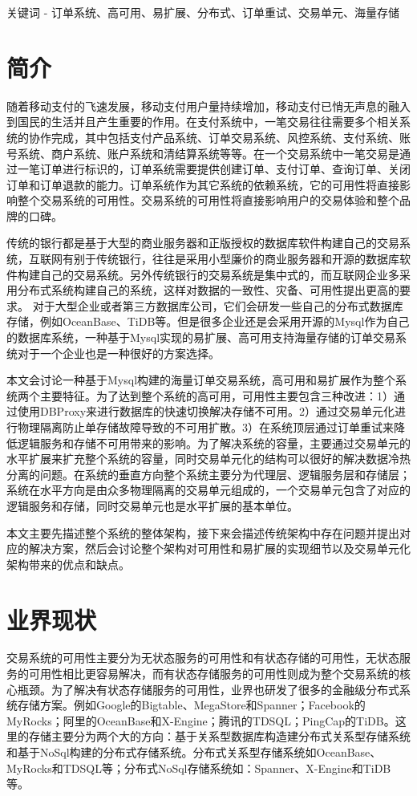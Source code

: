 \documentclass[letterpaper,twocolumn,10pt]{article}
\begin{document}
关键词 - 订单系统、高可用、易扩展、分布式、订单重试、交易单元、海量存储

\section{简介}
随着移动支付的飞速发展，移动支付用户量持续增加，移动支付已悄无声息的融入到国民的生活并且产生重要的作用。在支付系统中，一笔交易往往需要多个相关系统的协作完成，其中包括支付产品系统、订单交易系统、风控系统、支付系统、账号系统、商户系统、账户系统和清结算系统等等。在一个交易系统中一笔交易是通过一笔订单进行标识的，订单系统需要提供创建订单、支付订单、查询订单、关闭订单和订单退款的能力。订单系统作为其它系统的依赖系统，它的可用性将直接影响整个交易系统的可用性。交易系统的可用性将直接影响用户的交易体验和整个品牌的口碑。

传统的银行都是基于大型的商业服务器和正版授权的数据库软件构建自己的交易系统，互联网有别于传统银行，往往是采用小型廉价的商业服务器和开源的数据库软件构建自己的交易系统。另外传统银行的交易系统是集中式的，而互联网企业多采用分布式系统构建自己的系统，这样对数据的一致性、灾备、可用性提出更高的要求。
对于大型企业或者第三方数据库公司，它们会研发一些自己的分布式数据库存储，例如OceanBase、TiDB等。但是很多企业还是会采用开源的Mysql作为自己的数据库系统，一种基于Mysql实现的易扩展、高可用支持海量存储的订单交易系统对于一个企业也是一种很好的方案选择。

本文会讨论一种基于Mysql构建的海量订单交易系统，高可用和易扩展作为整个系统两个主要特征。为了达到整个系统的高可用，可用性主要包含三种改进：1）通过使用DBProxy来进行数据库的快速切换解决存储不可用。2）通过交易单元化进行物理隔离防止单存储故障导致的不可用扩散。3）在系统顶层通过订单重试来降低逻辑服务和存储不可用带来的影响。为了解决系统的容量，主要通过交易单元的水平扩展来扩充整个系统的容量，同时交易单元化的结构可以很好的解决数据冷热分离的问题。在系统的垂直方向整个系统主要分为代理层、逻辑服务层和存储层；系统在水平方向是由众多物理隔离的交易单元组成的，一个交易单元包含了对应的逻辑服务和存储，同时交易单元也是水平扩展的基本单位。

本文主要先描述整个系统的整体架构，接下来会描述传统架构中存在问题并提出对应的解决方案，然后会讨论整个架构对可用性和易扩展的实现细节以及交易单元化架构带来的优点和缺点。

\section{业界现状}

交易系统的可用性主要分为无状态服务的可用性和有状态存储的可用性，无状态服务的可用性相比更容易解决，而有状态存储服务的可用性则成为整个交易系统的核心瓶颈。为了解决有状态存储服务的可用性，业界也研发了很多的金融级分布式系统存储方案。例如Google的Bigtable、MegaStore和Spanner；Facebook的MyRocks；阿里的OceanBase和X-Engine；腾讯的TDSQL；PingCap的TiDB。这里的存储主要分为两个大的方向：基于关系型数据库构造建分布式关系型存储系统和基于NoSql构建的分布式存储系统。分布式关系型存储系统如OceanBase、MyRocks和TDSQL等；分布式NoSql存储系统如：Spanner、X-Engine和TiDB等。
\end{document}
